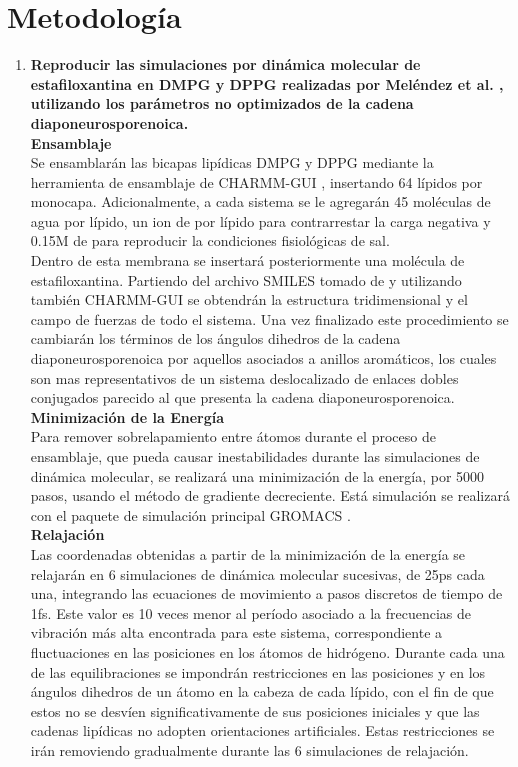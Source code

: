 \section{Metodología}

\begin{enumerate}
\item \textbf{Reproducir las simulaciones por dinámica molecular de estafiloxantina en DMPG y DPPG realizadas  por Meléndez et al. \cite{MelendezDelgado2018StudyingBilayers}, utilizando los parámetros no optimizados de la cadena diaponeurosporenoica.}\label{item:1}\\

\textbf{Ensamblaje}\\
Se ensamblarán las bicapas lipídicas DMPG y DPPG mediante la herramienta de ensamblaje de CHARMM-GUI \cite{Sunhwan2008CHARMM-GUI:CHARMM}, insertando 64 lípidos por monocapa. Adicionalmente, a cada sistema se le agregarán 45 moléculas de agua por lípido,  un ion de  por lípido  para contrarrestar la carga negativa y 0.15M de  para reproducir la condiciones fisiológicas de sal.\\
Dentro de esta membrana se insertará posteriormente una molécula de estafiloxantina. Partiendo del archivo SMILES tomado de \cite{NationalCenterforBiotechnologyInformationPubChemCID=24892781} y utilizando también CHARMM-GUI se obtendrán la estructura tridimensional y el campo de fuerzas de todo el sistema. Una vez finalizado este procedimiento se cambiarán los términos de los ángulos dihedros  de la cadena diaponeurosporenoica por aquellos asociados a anillos aromáticos, los cuales son mas representativos de un sistema deslocalizado de enlaces dobles conjugados parecido al que presenta la cadena diaponeurosporenoica.\\
\textbf{Minimización de la Energía}\\
Para remover sobrelapamiento entre átomos durante el proceso de ensamblaje, que pueda causar inestabilidades durante las simulaciones de dinámica molecular, se realizará una minimización de la energía, por 5000 pasos, usando el método de gradiente decreciente. Está simulación se realizará con el paquete de simulación principal GROMACS \cite{AbrahamGROMACS2019}.\\

\textbf{Relajación}\\
Las coordenadas obtenidas a partir de la minimización de la energía se relajarán en 6 simulaciones de dinámica molecular sucesivas, de 25ps cada una, integrando las ecuaciones de movimiento a pasos discretos de tiempo de 1fs. Este valor es 10 veces menor al período asociado a la frecuencias de vibración más alta encontrada para este sistema, correspondiente a fluctuaciones en las posiciones en los átomos de hidrógeno. Durante cada una de las equilibraciones se impondrán restricciones en las posiciones y en los ángulos dihedros de un átomo en la cabeza de cada lípido, con el fin de que estos no se desvíen significativamente de sus posiciones iniciales y que las cadenas lipídicas no adopten orientaciones artificiales. Estas restricciones se irán removiendo gradualmente durante las 6 simulaciones de relajación.\\


\end{enumerate}

